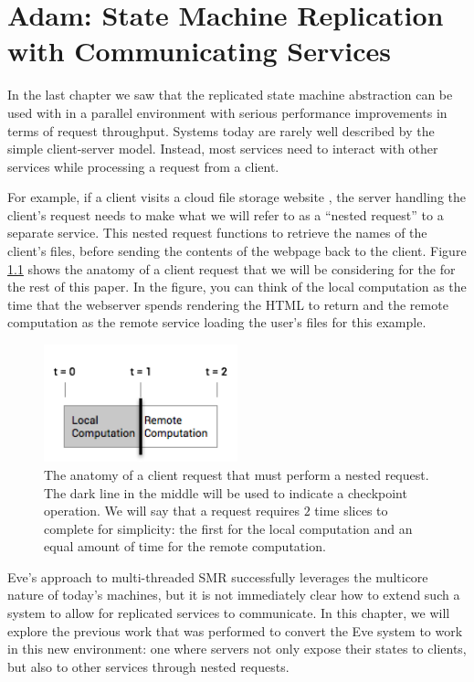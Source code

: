 \documentclass[11pt, oneside]{report}
\begin{document}
\chapter{Adam: State Machine Replication with Communicating Services}\label{Adam}

In the last chapter we saw that the replicated state machine abstraction can be used with in a parallel environment with serious performance improvements in terms of request throughput. 
Systems today are rarely well described by the simple client-server model.
Instead, most services need to interact with other services while processing a request from a client. 

For example, if a client visits a cloud file storage website \cite{dropbox}, the server handling the client's request needs to make what we will refer to as a ``nested request'' to a separate service. This nested request functions to retrieve the names of the client's files, before sending the contents of the webpage back to the client. Figure \ref{anatomy} shows the anatomy of a client request that we will be considering for the for the rest of this paper. In the figure, you can think of the local computation as the time that the webserver spends rendering the HTML to return and the remote computation as the remote service loading the user's files for this example.

\begin{figure}[h]
\centering
\includegraphics[width=0.5\textwidth]{RequestAnatomy.png}
\caption{\label{anatomy}The anatomy of a client request that must perform a nested request. The dark line in the middle will be used to indicate a checkpoint operation. We will say that a request requires $2$ time slices to complete for simplicity: the first for the local computation and an equal amount of time for the remote computation.}
\end{figure}

Eve's approach to multi-threaded SMR successfully leverages the multicore nature of today's machines, but it is not immediately clear how to extend such a system to allow for replicated services to communicate. 
In this chapter, we will explore the previous work that was performed to convert the Eve system to work in this new environment: one where servers not only expose their states to clients, but also to other services through nested requests.
\end{document}
